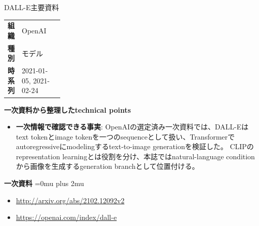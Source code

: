 \begin{technicalnote}{DALL-E}{主要資料}
\begingroup
\begin{tabularx}{\linewidth}{@{}>{\bfseries}p{0.22\linewidth}X@{}}
組織 & OpenAI \\
種別 & モデル \\
時系列 & 2021-01-05, 2021-02-24 \\
\end{tabularx}
\smallskip
\begin{minipage}{\linewidth}
{\bfseries 一次資料から整理したtechnical points}
\begin{itemize}[leftmargin=1.5em,itemsep=0.35em]
\item \textbf{一次情報で確認できる事実}: OpenAIの選定済み一次資料では、DALL-Eはtext tokenとimage tokenを一つのsequenceとして扱い、Transformerでautoregressiveにmodelingするtext-to-image generationを検証した。 CLIPのrepresentation learningとは役割を分け、本誌ではnatural-language conditionから画像を生成するgeneration branchとして位置付ける。
\end{itemize}
\begin{minipage}{\linewidth}
\begin{samepage}
{\bfseries 一次資料}
\begingroup\sloppy
\Urlmuskip=0mu plus 2mu\relax
\begin{itemize}[leftmargin=1.5em,itemsep=0.25em]
\item {\scriptsize\url{http://arxiv.org/abs/2102.12092v2}}
\item {\scriptsize\url{https://openai.com/index/dall-e}}
\end{itemize}
\endgroup
\end{samepage}
\end{minipage}
\end{minipage}
\endgroup
\end{technicalnote}
\medskip
